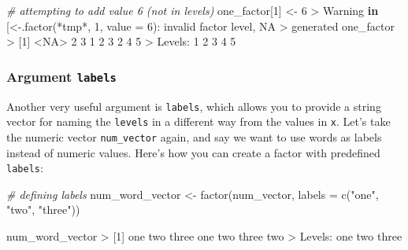 \documentclass[
]{book}
\newenvironment{Shaded}{\begin{snugshade}}{\end{snugshade}}
\newcommand{\AttributeTok}[1]{\textcolor[rgb]{0.77,0.63,0.00}{#1}}
\newcommand{\CommentTok}[1]{\textcolor[rgb]{0.56,0.35,0.01}{\textit{#1}}}
\newcommand{\ConstantTok}[1]{\textcolor[rgb]{0.00,0.00,0.00}{#1}}
\newcommand{\ControlFlowTok}[1]{\textcolor[rgb]{0.13,0.29,0.53}{\textbf{#1}}}
\newcommand{\DecValTok}[1]{\textcolor[rgb]{0.00,0.00,0.81}{#1}}
\newcommand{\FunctionTok}[1]{\textcolor[rgb]{0.00,0.00,0.00}{#1}}
\newcommand{\NormalTok}[1]{#1}
\newcommand{\OtherTok}[1]{\textcolor[rgb]{0.56,0.35,0.01}{#1}}
\newcommand{\SpecialCharTok}[1]{\textcolor[rgb]{0.00,0.00,0.00}{#1}}
\newcommand{\StringTok}[1]{\textcolor[rgb]{0.31,0.60,0.02}{#1}}
\begin{document}
\begin{Shaded}
\begin{Highlighting}[]
\CommentTok{\# attempting to add value 6 (not in levels)}
\NormalTok{one\_factor[}\DecValTok{1}\NormalTok{] }\OtherTok{\textless{}{-}} \DecValTok{6}
\SpecialCharTok{\textgreater{}}\NormalTok{ Warning }\ControlFlowTok{in} \StringTok{\textasciigrave{}}\AttributeTok{[\textless{}{-}.factor}\StringTok{\textasciigrave{}}\NormalTok{(}\StringTok{\textasciigrave{}}\AttributeTok{*tmp*}\StringTok{\textasciigrave{}}\NormalTok{, }\DecValTok{1}\NormalTok{, }\AttributeTok{value =} \DecValTok{6}\NormalTok{)}\SpecialCharTok{:}\NormalTok{ invalid factor level, }\ConstantTok{NA}
\SpecialCharTok{\textgreater{}}\NormalTok{ generated}
\NormalTok{one\_factor}
\SpecialCharTok{\textgreater{}}\NormalTok{ [}\DecValTok{1}\NormalTok{] }\SpecialCharTok{\textless{}}\ConstantTok{NA}\SpecialCharTok{\textgreater{}} \DecValTok{2}    \DecValTok{3}    \DecValTok{1}    \DecValTok{2}    \DecValTok{3}    \DecValTok{2}    \DecValTok{4}    \DecValTok{5}   
\SpecialCharTok{\textgreater{}}\NormalTok{ Levels}\SpecialCharTok{:} \DecValTok{1} \DecValTok{2} \DecValTok{3} \DecValTok{4} \DecValTok{5}
\end{Highlighting}
\end{Shaded}

\hypertarget{argument-labels}{%
\subsubsection*{\texorpdfstring{Argument \texttt{labels}}{Argument labels}}\label{argument-labels}}

Another very useful argument is \texttt{labels}, which allows you to provide a string
vector for naming the \texttt{levels} in a different way from the values in \texttt{x}. Let's
take the numeric vector \texttt{num\_vector} again, and say we want to use words as
labels instead of numeric values. Here's how you can create a factor with
predefined \texttt{labels}:

\begin{Shaded}
\begin{Highlighting}[]
\CommentTok{\# defining labels}
\NormalTok{num\_word\_vector }\OtherTok{\textless{}{-}} \FunctionTok{factor}\NormalTok{(num\_vector, }\AttributeTok{labels =} \FunctionTok{c}\NormalTok{(}\StringTok{"one"}\NormalTok{, }\StringTok{"two"}\NormalTok{, }\StringTok{"three"}\NormalTok{))}

\NormalTok{num\_word\_vector}
\SpecialCharTok{\textgreater{}}\NormalTok{ [}\DecValTok{1}\NormalTok{] one   two   three one   two   three two  }
\SpecialCharTok{\textgreater{}}\NormalTok{ Levels}\SpecialCharTok{:}\NormalTok{ one two three}
\end{Highlighting}
\end{Shaded}
\end{document}
